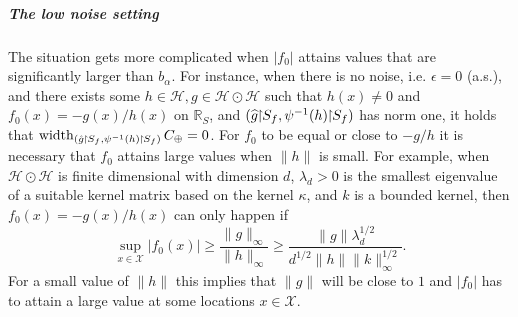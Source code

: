 \documentclass[AHL,Unicode,longabstracts,published]{cedram}
\theoremstyle{remark}
\DeclareMathOperator{\diam}{width}
\newcommand{\restrr}
{\!\!\upharpoonright\!\!}
\newcommand{\R}{\mathbb{R}}
\newcommand{\X}{\mathcal{X}}
\newcommand{\cH}{\mathcal{H}}
\newcommand*{\mk}{\mkern -1mu}
\let\oldhat\hat
\renewcommand*{\hat}[1]{\mathchoice{\widehat{#1}}{\widehat{#1}}{\oldhat{#1}}{\oldhat{#1}}}
\begin{document}
\subparagraph{The low noise setting}
The situation gets more complicated when $|f_0|$ attains values that are significantly larger than $b_\alpha$. For instance, when there is no noise, i.e. $\epsilon = 0$ (a.s.), and there exists some $h\in \cH, g\in \cH \odot \cH$ such that $h(x) \not = 0$ and $f_0(x) = - g(x)/h(x)$ on $\R_S$, and $(\hat g\restrr S_f,\psi^{-1}(h)\restrr S_f)$ has norm one, it holds that $\diam_{(\hat g \mk\upharpoonright\mk S_f,\psi^{-1}(h) \mk\upharpoonright\mk S_f)} C_\oplus = 0$. For $f_0$ to be equal or close to $-g /h $ it is necessary that $f_0$ attains large values when $\|h\|$ is small. For example, when $\cH \odot \cH$ is finite dimensional with dimension $d$, $\lambda_d > 0$ is the smallest eigenvalue of a suitable kernel matrix based on the kernel $\kappa$, and $k$ is a bounded kernel, then $f_0(x) = - g(x)/h(x)$ can only happen if
\[
\sup_{x\in \X} |f_0(x)| \geq \frac{\|g\|_\infty}{\|h\|_\infty} \geq \frac{\|g\| \lambda_d^{1/2}}{d^{1/2} \|h\| \|k\|_\infty^{1/2}}.
\]
For a small value of $\|h\|$ this implies that $\|g\|$ will be close to $1$ and $|f_0|$ has to attain a large value at some locations $x \in \X$.
\end{document}
